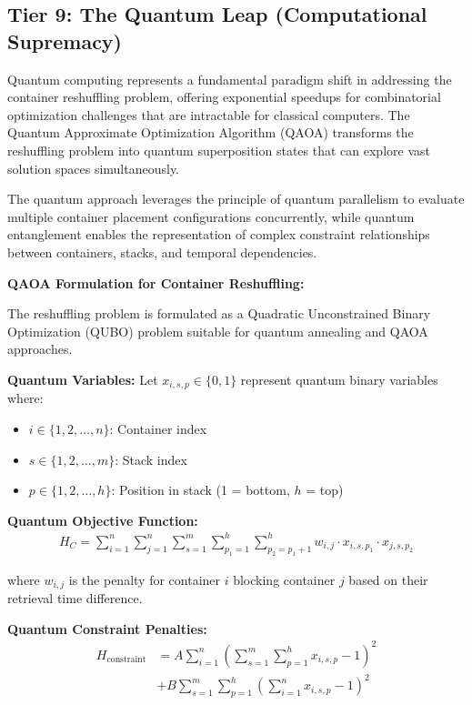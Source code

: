 \documentclass{article}
\begin{document}
\subsection{Tier 9: The Quantum Leap (Computational Supremacy)}

Quantum computing represents a fundamental paradigm shift in addressing the container reshuffling problem, offering exponential speedups for combinatorial optimization challenges that are intractable for classical computers. The Quantum Approximate Optimization Algorithm (QAOA) transforms the reshuffling problem into quantum superposition states that can explore vast solution spaces simultaneously.

The quantum approach leverages the principle of quantum parallelism to evaluate multiple container placement configurations concurrently, while quantum entanglement enables the representation of complex constraint relationships between containers, stacks, and temporal dependencies.

\textbf{QAOA Formulation for Container Reshuffling:}

The reshuffling problem is formulated as a Quadratic Unconstrained Binary Optimization (QUBO) problem suitable for quantum annealing and QAOA approaches.

\textbf{Quantum Variables:}
Let $x_{i,s,p} \in \{0,1\}$ represent quantum binary variables where:
\begin{itemize}
\item $i \in \{1,2,\ldots,n\}$: Container index
\item $s \in \{1,2,\ldots,m\}$: Stack index  
\item $p \in \{1,2,\ldots,h\}$: Position in stack (1 = bottom, $h$ = top)
\end{itemize}

\textbf{Quantum Objective Function:}
\begin{align}
H_C = \sum_{i=1}^{n} \sum_{j=1}^{n} \sum_{s=1}^{m} \sum_{p_1=1}^{h} \sum_{p_2=p_1+1}^{h} w_{i,j} \cdot x_{i,s,p_1} \cdot x_{j,s,p_2}
\end{align}

where $w_{i,j}$ is the penalty for container $i$ blocking container $j$ based on their retrieval time difference.

\textbf{Quantum Constraint Penalties:}
\begin{align}
H_{\text{constraint}} &= A \sum_{i=1}^{n} \left(\sum_{s=1}^{m} \sum_{p=1}^{h} x_{i,s,p} - 1\right)^2 \\
&+ B \sum_{s=1}^{m} \sum_{p=1}^{h} \left(\sum_{i=1}^{n} x_{i,s,p} - 1\right)^2
\end{align}
\end{document}
